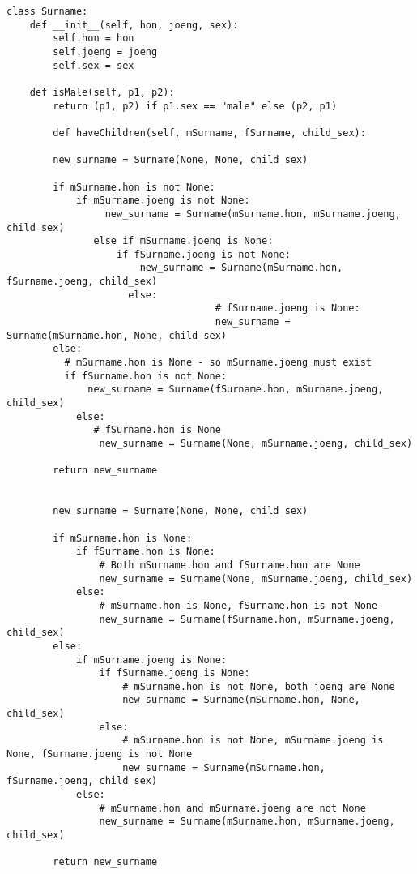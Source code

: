 \begin{lstlisting}[caption={Python Surname Class}, label={lst:surname}]
  class Surname: 
    def __init__(self, hon, joeng, sex):
        self.hon = hon
        self.joeng = joeng
        self.sex = sex

    def isMale(self, p1, p2):
        return (p1, p2) if p1.sex == "male" else (p2, p1)

		def haveChildren(self, mSurname, fSurname, child_sex):
        
        new_surname = Surname(None, None, child_sex)

        if mSurname.hon is not None:
            if mSurname.joeng is not None: 
	             new_surname = Surname(mSurname.hon, mSurname.joeng, child_sex)
	           else if mSurname.joeng is None:
		           if fSurname.joeng is not None:
			           new_surname = Surname(mSurname.hon, fSurname.joeng, child_sex)
			         else:
									# fSurname.joeng is None: 
									new_surname = Surname(mSurname.hon, None, child_sex)	        
        else:
          # mSurname.hon is None - so mSurname.joeng must exist 
          if fSurname.hon is not None: 
	          new_surname = Surname(fSurname.hon, mSurname.joeng, child_sex)
	        else:
		       # fSurname.hon is None
		        new_surname = Surname(None, mSurname.joeng, child_sex)
            
        return new_surname
        
        
        new_surname = Surname(None, None, child_sex)

        if mSurname.hon is None:
            if fSurname.hon is None:
                # Both mSurname.hon and fSurname.hon are None
                new_surname = Surname(None, mSurname.joeng, child_sex)
            else:
                # mSurname.hon is None, fSurname.hon is not None
                new_surname = Surname(fSurname.hon, mSurname.joeng, child_sex)
        else:
            if mSurname.joeng is None:
                if fSurname.joeng is None:
                    # mSurname.hon is not None, both joeng are None
                    new_surname = Surname(mSurname.hon, None, child_sex)
                else:
                    # mSurname.hon is not None, mSurname.joeng is None, fSurname.joeng is not None
                    new_surname = Surname(mSurname.hon, fSurname.joeng, child_sex)
            else:
                # mSurname.hon and mSurname.joeng are not None
                new_surname = Surname(mSurname.hon, mSurname.joeng, child_sex)

        return new_surname     
   

\end{lstlisting}



